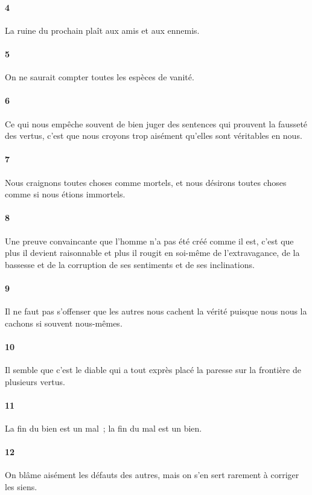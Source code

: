 \documentclass[french,twoside]{book} %
\begin{document}
\paragraph[{4}]{ \textsc{4} }
\noindent La ruine du prochain plaît aux amis et aux ennemis.
\paragraph[{5}]{ \textsc{5} }
\noindent On ne saurait compter toutes les espèces de vanité.
\paragraph[{6}]{ \textsc{6} }
\noindent Ce qui nous empêche souvent de bien juger des sentences qui prouvent la fausseté des vertus, c’est que nous croyons trop aisément qu’elles sont véritables en nous.
\paragraph[{7}]{ \textsc{7} }
\noindent Nous craignons toutes choses comme mortels, et nous désirons toutes choses comme si nous étions immortels.
\paragraph[{8}]{ \textsc{8} }
\noindent Une preuve convaincante que l’homme n’a pas été créé comme il est, c’est que plus il devient raisonnable et plus il rougit en soi-même de l’extravagance, de la bassesse et de la corruption de ses sentiments et de ses inclinations.
\paragraph[{9}]{ \textsc{9} }
\noindent Il ne faut pas s’offenser que les autres nous cachent la vérité puisque nous nous la cachons si souvent nous-mêmes.
\paragraph[{10}]{ \textsc{10} }
\noindent Il semble que c’est le diable qui a tout exprès placé la paresse sur la frontière de plusieurs vertus.
\paragraph[{11}]{ \textsc{11} }
\noindent La fin du bien est un mal ; la fin du mal est un bien.
\paragraph[{12}]{ \textsc{12} }
\noindent On blâme aisément les défauts des autres, mais on s’en sert rarement à corriger les siens.
\end{document}
